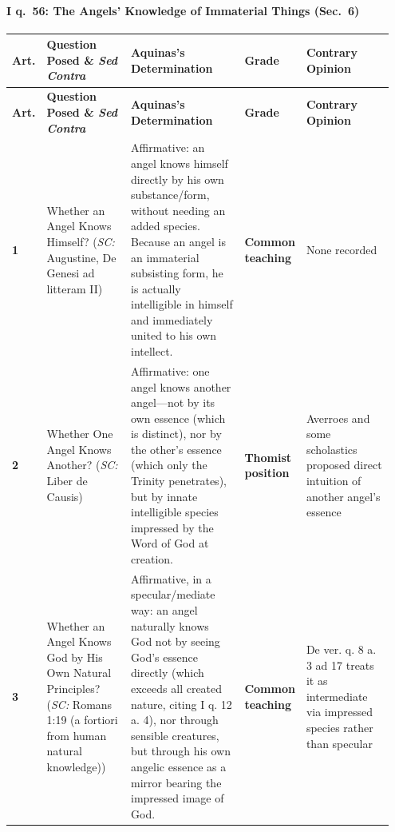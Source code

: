 \paragraph{I q.~56: The Angels' Knowledge of Immaterial Things (Sec.~6)}
{\scriptsize
\setlength{\tabcolsep}{2.5pt}
\renewcommand{\arraystretch}{1.15}
\begin{longtable}{>{\raggedright\arraybackslash}p{0.05\linewidth}>{\raggedright\arraybackslash}p{0.23\linewidth}>{\raggedright\arraybackslash}p{0.31\linewidth}>{\raggedright\arraybackslash}p{0.12\linewidth}>{\raggedright\arraybackslash}p{0.24\linewidth}}
\toprule
\textbf{Art.} & \textbf{Question Posed \& \emph{Sed Contra}} & \textbf{Aquinas's Determination} & \textbf{Grade} & \textbf{Contrary Opinion} \\
\midrule
\endfirsthead
\toprule
\textbf{Art.} & \textbf{Question Posed \& \emph{Sed Contra}} & \textbf{Aquinas's Determination} & \textbf{Grade} & \textbf{Contrary Opinion} \\
\midrule
\endhead
\bottomrule
\endfoot
\textbf{1} & Whether an Angel Knows Himself? (\emph{SC:} Augustine, De Genesi ad litteram II) & Affirmative: an angel knows himself directly by his own substance/form, without needing an added species. Because an angel is an immaterial subsisting form, he is actually intelligible in himself and immediately united to his own intellect. & \textbf{Common teaching} & None recorded \\
\addlinespace[1.5pt]
\textbf{2} & Whether One Angel Knows Another? (\emph{SC:} Liber de Causis) & Affirmative: one angel knows another angel---not by its own essence (which is distinct), nor by the other's essence (which only the Trinity penetrates), but by innate intelligible species impressed by the Word of God at creation. & \textbf{Thomist position} & Averroes and some scholastics proposed direct intuition of another angel's essence \\
\addlinespace[1.5pt]
\textbf{3} & Whether an Angel Knows God by His Own Natural Principles? (\emph{SC:} Romans 1:19 (a fortiori from human natural knowledge)) & Affirmative, in a specular/mediate way: an angel naturally knows God not by seeing God's essence directly (which exceeds all created nature, citing I q. 12 a. 4), nor through sensible creatures, but through his own angelic essence as a mirror bearing the impressed image of God. & \textbf{Common teaching} & De ver. q. 8 a. 3 ad 17 treats it as intermediate via impressed species rather than specular \\
\end{longtable}
}

